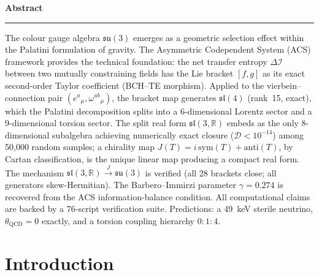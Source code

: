 \documentclass[11pt,a4paper]{article}
\theoremstyle{plain}
\theoremstyle{definition}
\theoremstyle{remark}
\newcommand{\DI}{\Delta\mathcal{I}}
\begin{document}
\begin{titlepage}
\begin{center}
\begin{minipage}{0.88\textwidth}
\begin{center}
  {\bfseries\color{acsprimary}\large Abstract}\\[0.3em]
  {\color{acsrule}\rule{1.2in}{0.3pt}}
\end{center}
\vspace{0.5em}
\small\noindent
The colour gauge algebra $\mathfrak{su}(3)$ emerges as a geometric
selection effect within the Palatini formulation of gravity.  The
Asymmetric Codependent System (ACS) framework provides the technical
foundation: the net transfer entropy $\DI$ between two mutually
constraining fields has the Lie bracket $[f,g]$ as its exact second-order
Taylor coefficient (BCH--TE morphism).  Applied to the
vierbein--connection pair $(e^a{}_\mu,\omega^{ab}{}_\mu)$, the bracket
map generates $\mathfrak{sl}(4)$ (rank~15, exact), which the Palatini
decomposition splits into a 6-dimensional Lorentz sector and a
9-dimensional torsion sector.  The split real form $\mathfrak{sl}(3,\mathbb{R})$
embeds as the only 8-dimensional subalgebra achieving numerically exact
closure ($\mathcal{D}<10^{-14}$) among 50{,}000 random samples;
a chirality map $J(T) = i\,\mathrm{sym}(T) + \mathrm{anti}(T)$,
by Cartan classification, is the unique linear map producing a compact
real form.  The mechanism $\mathfrak{sl}(3,\mathbb{R}) \xrightarrow{J} \mathfrak{su}(3)$
is verified (all 28 brackets close; all generators skew-Hermitian).
The Barbero--Immirzi parameter $\gamma = 0.274$ is recovered from the
ACS information-balance condition.  All computational claims are backed
by a 76-script verification suite.  Predictions: a 49~keV sterile
neutrino, $\theta_{\mathrm{QCD}}=0$ exactly, and a torsion coupling
hierarchy $0{:}1{:}4$.
\end{minipage}
\end{center}

\vfill

\noindent{\color{acsrule}\rule{\textwidth}{0.4pt}}
\end{titlepage}

\clearpage
{}
\setcounter{page}{1}

\tableofcontents
\clearpage
{}
\setcounter{page}{1}

\section{Introduction}
\label{sec:intro}
\end{document}
